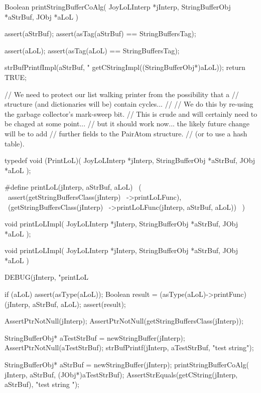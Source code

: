 \startCCode
Boolean printStringBufferCoAlg(
  JoyLoLInterp    *jInterp,
  StringBufferObj *aStrBuf,
  JObj        *aLoL
) {
  assert(aStrBuf);
  assert(asTag(aStrBuf) == StringBuffersTag);
  
  assert(aLoL);
  assert(asTag(aLoL) == StringBuffersTag);

  strBufPrintfImpl(aStrBuf, "%
    getCStringImpl((StringBufferObj*)aLoL));
  return TRUE;
}
\stopCCode

\startCCode
// We need to protect our list walking printer from the possibility that a
// structure (and dictionaries will be) contain cycles...
//
// We do this by re-using the garbage collector's mark-sweep bit.
// This is crude and will certainly need to be chaged at some point...
// but it should work now... the likely future change will be to add
// further fields to the PairAtom structure.
// (or to use a hash table).
\stopCCode

\startCHeader
typedef void (PrintLoL)(
  JoyLoLInterp    *jInterp,
  StringBufferObj *aStrBuf,
  JObj        *aLoL
);

#define printLoL(jInterp, aStrBuf, aLoL)       \ 
  (                                            \
    assert(getStringBuffersClass(jInterp)      \
      ->printLoLFunc),                         \
    (getStringBuffersClass(jInterp)            \
      ->printLoLFunc(jInterp, aStrBuf, aLoL))  \
  )
\stopCHeader

\setCHeaderStream{private}
\startCHeader
void printLoLImpl(
  JoyLoLInterp    *jInterp,
  StringBufferObj *aStrBuf,
  JObj        *aLoL
);
\stopCHeader
{}

\startCCode
void printLoLImpl(
  JoyLoLInterp    *jInterp,
  StringBufferObj *aStrBuf,
  JObj        *aLoL
) {
  DEBUG(jInterp, "printLoL %

  if (aLoL) {
    assert(asType(aLoL));
    Boolean result =
      (asType(aLoL)->printFunc)(jInterp, aStrBuf, aLoL);
    assert(result);
  }
}
\stopCCode
{}

\startCTest
  AssertPtrNotNull(jInterp);
  AssertPtrNotNull(getStringBuffersClass(jInterp));

  StringBufferObj* aTestStrBuf = newStringBuffer(jInterp);
  AssertPtrNotNull(aTestStrBuf);
  strBufPrintf(jInterp, aTestStrBuf, "test string");
  
  StringBufferObj* aStrBuf = newStringBuffer(jInterp);
  printStringBufferCoAlg(
    jInterp, aStrBuf, (JObj*)aTestStrBuf);
  AssertStrEquals(getCString(jInterp, aStrBuf), "test string ");
  
